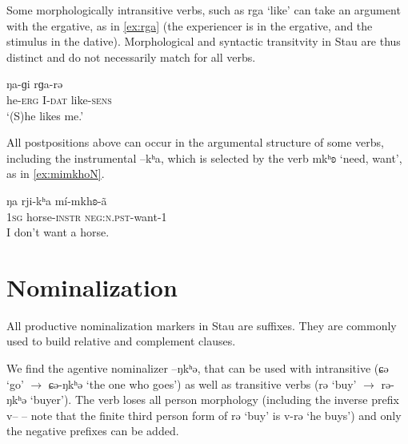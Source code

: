 \documentclass[oneside,a4paper,11pt]{article}
\newcommand{\ipa}[1]{{\phon #1}} %
\begin{document}
Some morphologically intransitive verbs, such as \ipa{rga} `like' can take an argument with the ergative, as in \ref{ex:rga} (the experiencer is in the ergative, and the stimulus in the dative). Morphological and syntactic transitvity in Stau are thus distinct and do not necessarily match for all verbs.

 \begin{exe}
\ex \label{ex:rga}
\gll \ipa{tə-w}  	\ipa{ŋa-ɡi}  	\ipa{rɡa-rə}  
 \\
he-\textsc{erg} I-\textsc{dat} like-\textsc{sens} \\
\glt `(S)he likes me.'
\end{exe}

All postpositions above can occur in the argumental structure of some verbs, including the instrumental \ipa{--kʰa}, which is selected by the verb \ipa{mkʰʚ} `need, want', as in \ref{ex:mimkhoN}.

 \begin{exe}
\ex \label{ex:mimkhoN}
\gll
\ipa{ŋa} 	\ipa{rji-kʰa} 	\ipa{mí-mkhʚ-ã} \\
\textsc{1sg} horse-\textsc{instr} \textsc{neg:n.pst}-want-1 \\
\glt I don't want a horse.
\end{exe}

%	


 


%
%
%
%
%
%

%


\section{Nominalization} \label{sec:nmlz}
All productive nominalization markers in Stau are suffixes. They are commonly used to build relative and complement clauses.

We find the agentive nominalizer \ipa{--ŋkʰə}, that can be used with intransitive (\ipa{ɕə}  `go' $\rightarrow$ \ipa{ɕə-ŋkʰə} `the one who goes') as well as transitive verbs (\ipa{rə} `buy' $\rightarrow$ \ipa{rə-ŋkʰə} `buyer'). The verb loses all person morphology (including the inverse prefix \ipa{v--} -- note that the finite third person form of \ipa{rə} `buy' is \ipa{v-rə} `he buys') and only the negative prefixes can be added.
 
\end{document}
